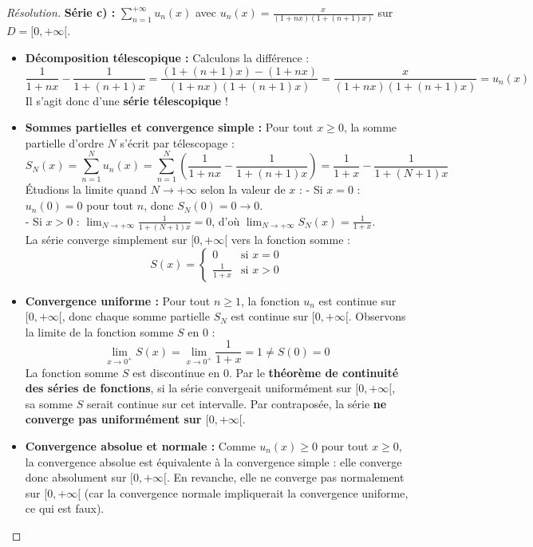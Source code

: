 \documentclass[12pt,a4paper]{report}
\begin{document}
\begin{proof}[Résolution]
\textbf{Série c) :} $\sum_{n=1}^{+\infty} u_n(x)$ avec $u_n(x) = \frac{x}{(1+nx)(1+(n+1)x)}$ sur $D = [0, +\infty[$.
\begin{itemize}
    \item \textbf{Décomposition télescopique :}
    Calculons la différence :
    \[ \frac{1}{1+nx} - \frac{1}{1+(n+1)x} = \frac{(1+(n+1)x) - (1+nx)}{(1+nx)(1+(n+1)x)} = \frac{x}{(1+nx)(1+(n+1)x)} = u_n(x) \]
    Il s'agit donc d'une \textbf{série télescopique} !
    \item \textbf{Sommes partielles et convergence simple :}
    Pour tout $x \ge 0$, la somme partielle d'ordre $N$ s'écrit par télescopage :
    \[ S_N(x) = \sum_{n=1}^N u_n(x) = \sum_{n=1}^N \left( \frac{1}{1+nx} - \frac{1}{1+(n+1)x} \right) = \frac{1}{1+x} - \frac{1}{1+(N+1)x} \]
    Étudions la limite quand $N \to +\infty$ selon la valeur de $x$ :
    - Si $x = 0$ : $u_n(0) = 0$ pour tout $n$, donc $S_N(0) = 0 \to 0$.\\
    - Si $x > 0$ : $\lim_{N \to +\infty} \frac{1}{1+(N+1)x} = 0$, d'où $\lim_{N \to +\infty} S_N(x) = \frac{1}{1+x}$.\\
    La série converge simplement sur $[0, +\infty[$ vers la fonction somme :
    \[ S(x) = \begin{cases} 0 & \text{si } x = 0 \\ \frac{1}{1+x} & \text{si } x > 0 \end{cases} \]
    \item \textbf{Convergence uniforme :}
    Pour tout $n \ge 1$, la fonction $u_n$ est continue sur $[0, +\infty[$, donc chaque somme partielle $S_N$ est continue sur $[0, +\infty[$.
    Observons la limite de la fonction somme $S$ en 0 :
    \[ \lim_{x \to 0^+} S(x) = \lim_{x \to 0^+} \frac{1}{1+x} = 1 \neq S(0) = 0 \]
    La fonction somme $S$ est discontinue en 0.
    Par le \textbf{théorème de continuité des séries de fonctions}, si la série convergeait uniformément sur $[0, +\infty[$, sa somme $S$ serait continue sur cet intervalle.
    Par contraposée, la série \textbf{ne converge pas uniformément sur $[0, +\infty[$}.
    \item \textbf{Convergence absolue et normale :}
    Comme $u_n(x) \ge 0$ pour tout $x \ge 0$, la convergence absolue est équivalente à la convergence simple : elle converge donc absolument sur $[0, +\infty[$.
    En revanche, elle ne converge pas normalement sur $[0, +\infty[$ (car la convergence normale impliquerait la convergence uniforme, ce qui est faux).
\end{itemize}


\end{proof}
\end{document}

